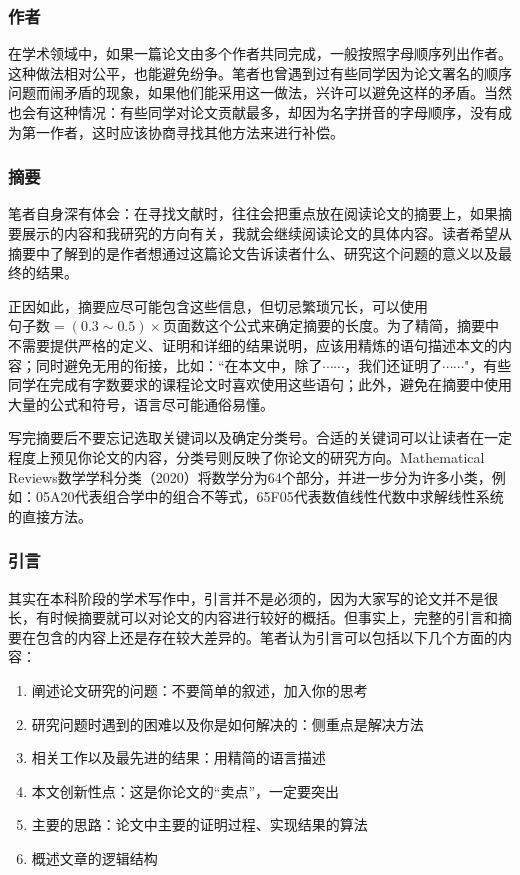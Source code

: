 \documentclass{formatBook}
\begin{document}
\subsubsection{作者}
在学术领域中，如果一篇论文由多个作者共同完成，一般按照字母顺序列出作者。这种做法相对公平，也能避免纷争。笔者也曾遇到过有些同学因为论文署名的顺序问题而闹矛盾的现象，如果他们能采用这一做法，兴许可以避免这样的矛盾。当然也会有这种情况：有些同学对论文贡献最多，却因为名字拼音的字母顺序，没有成为第一作者，这时应该协商寻找其他方法来进行补偿。
\subsubsection{摘要}
笔者自身深有体会：在寻找文献时，往往会把重点放在阅读论文的摘要上，如果摘要展示的内容和我研究的方向有关，我就会继续阅读论文的具体内容。读者希望从摘要中了解到的是作者想通过这篇论文告诉读者什么、研究这个问题的意义以及最终的结果。\par
正因如此，摘要应尽可能包含这些信息，但切忌繁琐冗长，可以使用$\text{句子数}=(0.3 \sim 0.5)\times \text{页面数}$这个公式来确定摘要的长度。为了精简，摘要中不需要提供严格的定义、证明和详细的结果说明，应该用精炼的语句描述本文的内容；同时避免无用的衔接，比如：“在本文中，除了$\cdots\cdots$，我们还证明了$\cdots\cdots$"，有些同学在完成有字数要求的课程论文时喜欢使用这些语句；此外，避免在摘要中使用大量的公式和符号，语言尽可能通俗易懂。\par
写完摘要后不要忘记选取关键词以及确定分类号。合适的关键词可以让读者在一定程度上预见你论文的内容，分类号则反映了你论文的研究方向。Mathematical Reviews数学学科分类（2020）将数学分为64个部分，并进一步分为许多小类，例如：05A20代表组合学中的组合不等式，65F05代表数值线性代数中求解线性系统的直接方法。
\subsubsection{引言}
其实在本科阶段的学术写作中，引言并不是必须的，因为大家写的论文并不是很长，有时候摘要就可以对论文的内容进行较好的概括。但事实上，完整的引言和摘要在包含的内容上还是存在较大差异的。笔者认为引言可以包括以下几个方面的内容：
\begin{enumerate}
    \item 阐述论文研究的问题：不要简单的叙述，加入你的思考
    \item 研究问题时遇到的困难以及你是如何解决的：侧重点是解决方法
    \item 相关工作以及最先进的结果：用精简的语言描述
    \item 本文创新性点：这是你论文的“卖点”，一定要突出
    \item 主要的思路：论文中主要的证明过程、实现结果的算法
    \item 概述文章的逻辑结构
\end{enumerate}
\end{document}
